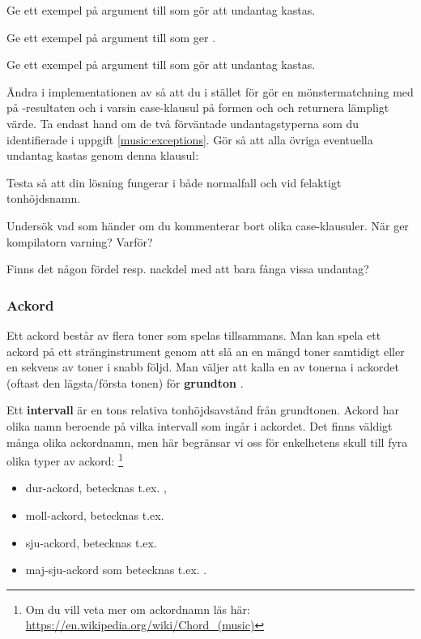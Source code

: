{


\Subtask\Pen Ge ett exempel på argument till  som gör att undantag kastas.

\Subtask\Pen Ge ett exempel på argument till  som ger .

\Subtask\Pen Ge ett exempel på argument till  som gör att undantag kastas.


\Task Ändra i implementationen av  så att du i stället för  gör en mönstermatchning med  på -resultaten  och  i varsin case-klausul på formen  och  och returnera lämpligt värde. Ta endast hand om de två förväntade undantagstyperna som du identifierade i uppgift \ref{music:exceptions}. Gör så att alla övriga eventuella undantag kastas genom denna klausul: 

\Subtask Testa så att din lösning fungerar i både normalfall och vid felaktigt tonhöjdsnamn.

\Subtask\Pen Undersök vad som händer om du kommenterar bort olika case-klausuler. När ger kompilatorn varning? Varför?

\Subtask\Pen Finns det någon fördel resp. nackdel med att bara fånga vissa undantag?

\subsubsection{Ackord}

Ett ackord består av flera toner som spelas tillsammans. Man kan spela ett ackord på ett stränginstrument genom att slå an en mängd toner samtidigt eller en sekvens av toner i snabb följd. Man väljer att kalla en av tonerna i ackordet (oftast den lägsta/första tonen) för \textbf{grundton} .

Ett \textbf{intervall} är en tons relativa tonhöjdsavstånd från grundtonen. Ackord har olika namn beroende på vilka intervall som ingår i ackordet. Det finns väldigt många olika ackordnamn, men här begränsar vi oss för enkelhetens skull till fyra olika typer av ackord: \footnote{Om du vill veta mer om ackordnamn läs här: \url{https://en.wikipedia.org/wiki/Chord_(music)}}
\begin{itemize}
  \item dur-ackord, betecknas t.ex. ,
  \item moll-ackord, betecknas t.ex. 
  \item sju-ackord, betecknas t.ex. 
  \item maj-sju-ackord som betecknas t.ex. .
\end{itemize}

}
